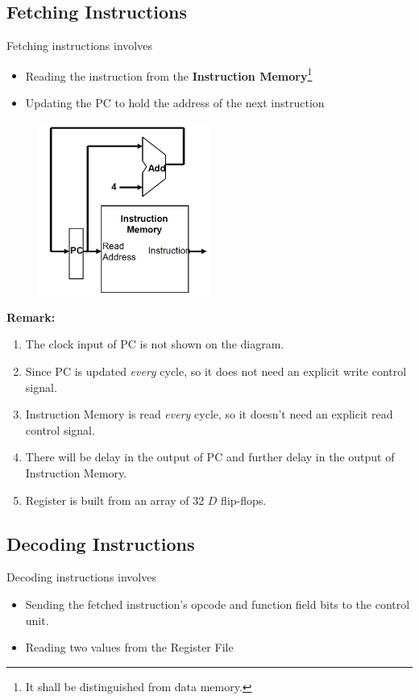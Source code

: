 \documentclass[12pt]{article}
\theoremstyle{definition}
\begin{document}
\subsection{Fetching Instructions}
Fetching instructions involves
\begin{itemize}
  \item Reading the instruction from the \textbf{Instruction Memory}\footnote{It shall be distinguished from data memory.}
  \item Updating the PC to hold the address of the next instruction
\end{itemize}
\begin{figure}[h]
\centering
\includegraphics[width = 0.5\textwidth]{12_2.png}
\end{figure}
\textbf{Remark:}
\begin{enumerate}
  \item The clock input of PC is not shown on the diagram.
  \item Since PC is updated \textit{every} cycle, so it does not need an explicit write control signal.
  \item Instruction Memory is read \textit{every} cycle, so it doesn't need an explicit read control signal.
  \item There will be delay in the output of PC and further delay in the output of Instruction Memory.
  \item Register is built from an array of 32 $D$ flip-flops.
\end{enumerate}
\subsection{Decoding Instructions}
Decoding instructions involves
\begin{itemize}
  \item Sending the fetched instruction's opcode and function field bits to the control unit.
  \item Reading two values from the Register File
\end{itemize}
\end{document}
